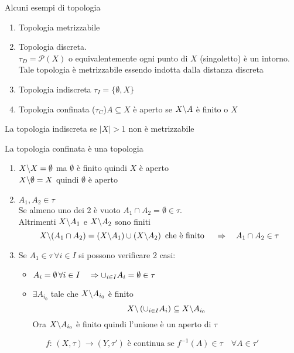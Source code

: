 \spazio
Alcuni esempi di topologia
\begin{enumerate}
	\item Topologia metrizzabile
	\item Topologia discreta.\\
	 $\tau_D=\mathcal{P}(X)$ o equivalentemente ogni punto di $X$ (singoletto) \`e un intorno.\\
	 Tale topologia \`e metrizzabile essendo indotta dalla distanza discreta
	 \item Topologia indiscreta $\tau_I=\{ \emptyset , X \}$
	 \item Topologia confinata ($\tau_C$)$A\subseteq X $ \`e aperto se $X\backslash A $ \`e finito o $X$
\end{enumerate}
\begin{ex}
La topologia indiscreta se $\vert X \vert  >1 $ non \`e metrizzabile	
\end{ex}
\begin{prop}
La topologia confinata \`e una topologia
\proof \bbianco
\begin{enumerate}
	\item $X\backslash X=\emptyset$ ma $\emptyset$ \`e finito quindi $X$ \`e aperto\\
		 $ X\backslash \emptyset = X $ quindi $\emptyset$ \`e aperto
	\item $A_1, A_2 \in \tau $ \\
	Se almeno uno dei 2 \`e vuoto $A_1\cap A_2 =\emptyset\in \tau$.\\
	Altrimenti $X\backslash A_1$ e $X\backslash A_2$ sono finiti 
	$$ X\backslash (A_1\cap A_2 ) = \left( X\backslash A_1 \right) \cup \left( X\backslash A_2 \right) \text{ che \`e finito } \quad \Rightarrow \quad A_1\cap A_2 \in \tau$$
	\item Se $A_1\in \tau \, \forall i\in I $ si possono verificare 2 casi:\begin{itemize}
		\item $A_i=\emptyset \, \forall i\in I \quad \Rightarrow \displaystyle \cup_{i\in I} A_i=\emptyset\in \tau$
		\item  $\exists A_{i_0}$ tale che $X\backslash A_{i_0}$ \`e finito 
		$$ X \backslash \left( \cup_{i\in I} A_i  \right)\subseteq X\backslash A_{i_0} $$
		Ora $X\backslash A_{i_0}$ \`e finito quindi l'unione \`e un aperto di $\tau$
 	\end{itemize}
\end{enumerate}	
\end{prop}
\newpage
\begin{defn}\bianco
$$ f:\, (X,\tau)\to (Y, \tau') \text{ \`e continua se } f^{-1}(A)\in \tau \quad \forall A\in \tau'$$	
\end{defn}

